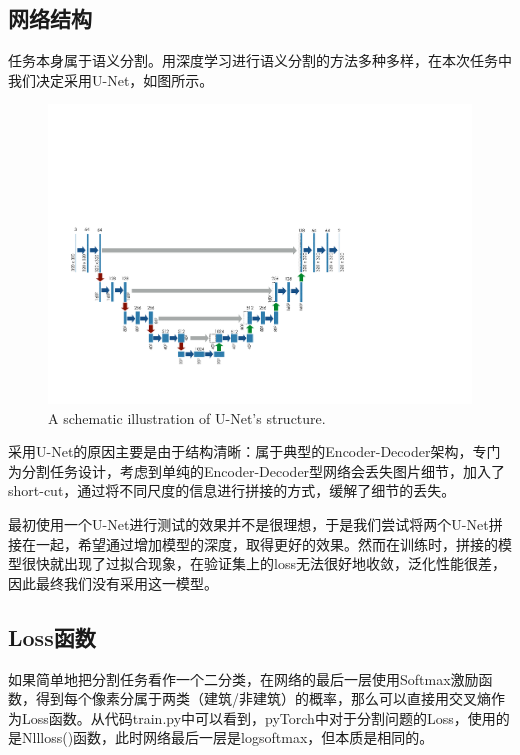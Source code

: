 \documentclass[a4paper,12pt]{article}
\begin{document}
\begin{CJK*}{UTF8}{gbsn}
\begin{spacing}{1.2}
    \section{网络结构}
    任务本身属于语义分割。用深度学习进行语义分割的方法多种多样，在本次任务中我们决定采用U-Net，如图所示。
    \begin{figure} [!]
    \centering
    \includegraphics[width=14.0cm]{U_Net.pdf}
    \caption{A schematic illustration of U-Net's structure.}
    \label{fig:Fig 1}
    \end{figure}
    采用U-Net的原因主要是由于结构清晰：属于典型的Encoder-Decoder架构，专门为分割任务设计，考虑到单纯的Encoder-Decoder型网络会丢失图片细节，加入了short-cut，通过将不同尺度的信息进行拼接的方式，缓解了细节的丢失。
    
    最初使用一个U-Net进行测试的效果并不是很理想，于是我们尝试将两个U-Net拼接在一起，希望通过增加模型的深度，取得更好的效果。然而在训练时，拼接的模型很快就出现了过拟合现象，在验证集上的loss无法很好地收敛，泛化性能很差，因此最终我们没有采用这一模型。
    
    \subsection{Loss函数}
    如果简单地把分割任务看作一个二分类，在网络的最后一层使用Softmax激励函数，得到每个像素分属于两类（建筑/非建筑）的概率，那么可以直接用交叉熵作为Loss函数。从代码train.py中可以看到，pyTorch中对于分割问题的Loss，使用的是Nllloss()函数，此时网络最后一层是logsoftmax，但本质是相同的。
    

\end{spacing}
\end{CJK*}
\end{document}
